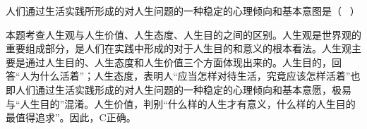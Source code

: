 \question 人们通过生活实践所形成的对人生问题的一种稳定的心理倾向和基本意图是（ ~）
\par{}
\begin{solution}本题考查人生观与人生价值、人生态度、人生目的之间的区别。人生观是世界观的重要组成部分，是人们在实践中形成的对于人生目的和意义的根本看法。人生观主要是通过人生目的、人生态度和人生价值三个方面体现出来的。人生目的，回答``人为什么活着''；人生态度，表明人``应当怎样对待生活，究竟应该怎样活着''也即人们通过生活实践形成的对人生问题的一种稳定的心理倾向和基本意愿，极易与``人生目的''混淆。人生价值，判别``什么样的人生才有意义，什么样的人生目的最值得追求''。因此，C正确。
\end{solution}
